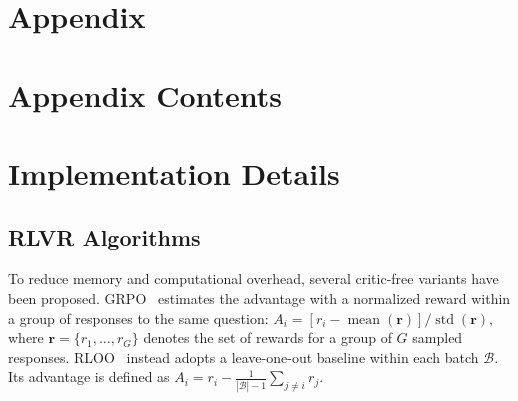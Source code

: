 


\newpage
\appendix
\section*{Appendix}

\renewcommand{\thesection}{\Alph{section}} %

\startcontents[appendix] %
\section*{Appendix Contents} %
               {\setcounter{tocdepth}{2}} %
\clearpage


\section{Implementation Details}


\subsection{RLVR Algorithms}
\label{appendix:rlvr_algos}
To reduce memory and computational overhead, several critic-free variants have been proposed.
GRPO~\cite{shao2024deepseekmath} estimates the advantage with a normalized reward within a group of responses to the same question:
$
A_i = [r_i - \operatorname{mean}(\textbf{r})]/{\operatorname{std}(\textbf{r})}$,
where $\textbf{r} = \{r_1, \ldots, r_G\}$
denotes the set of rewards for a group of $G$ sampled responses.
RLOO~\cite{ahmadian2024rloo} instead adopts a leave-one-out baseline within each batch $\mathcal{B}$. Its advantage is defined as
$A_i = r_i - \tfrac{1}{|\mathcal{B}| - 1} \sum_{j \neq i} r_j$.

